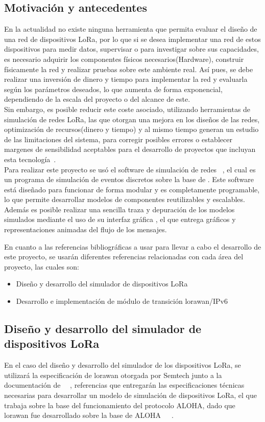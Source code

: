 \begin{justify}
\section{Motivación y antecedentes}
En la actualidad no existe ninguna herramienta que permita evaluar el diseño de una red de dispositivos LoRa, por lo que si se desea implementar una red de estos dispositivos para medir datos, supervisar o para investigar sobre sus capacidades, es necesario adquirir los componentes físicos necesarios(Hardware), construir físicamente la red y realizar pruebas sobre este ambiente real. Así pues, se debe realizar una inversión de dinero y tiempo para implementar la red y evaluarla según los parámetros deseados, lo que aumenta de forma exponencial, dependiendo de la escala del proyecto o del alcance de este.\\
Sin embargo, es posible reducir este coste asociado, utilizando herramientas de simulación de redes LoRa, las que otorgan una mejora en los diseños de las redes, optimización de recursos(dinero y tiempo) y al mismo tiempo generan un estudio de las limitaciones del sistema, para corregir posibles errores o establecer margenes de sensibilidad aceptables para el desarrollo de proyectos que incluyan esta tecnología~\cite{Xavier}.\\ 
Para realizar este proyecto se usó el software de simulación de redes \OMNET ~\cite{Omnet++}, el cual es un programa de simulación de eventos discretos sobre la base de \CC. Este software está diseñado para funcionar de forma modular y es completamente programable, lo que permite desarrollar modelos de componentes reutilizables y escalables. Además es posible realizar una sencilla traza y depuración de los modelos simulados mediante el uso de su interfaz gráfica , el que entrega gráficos y representaciones animadas del flujo de los mensajes.

En cuanto a las referencias bibliográficas a usar para llevar a cabo el desarrollo de este proyecto, se usarán diferentes referencias relacionadas con cada área del proyecto, las cuales son: 
\begin{itemize}
\item Diseño y desarrollo del simulador de dispositivos LoRa
\item Desarrollo e implementación de módulo de transición \gls{lorawan}/IPv6
\end{itemize}
\subsection{Diseño y desarrollo del simulador de dispositivos LoRa}
En el caso del diseño y desarrollo del simulador de los dispositivos LoRa, se utilizará la especificación de \gls{lorawan} otorgada por Semtech junto a la documentación de \OMNET ~\cite{Sornin}~\cite{Sornin2}, referencias que entregarán las especificaciones técnicas necesarias para  desarrollar un modelo de simulación de dispositivos LoRa, el que trabaja sobre la base del funcionamiento del protocolo ALOHA, dado que \gls{lorawan} fue desarrollado sobre la base de ALOHA~\cite{Sornin}~\cite{Abdullah}~\cite{NORMAN}. 

\end{justify}
